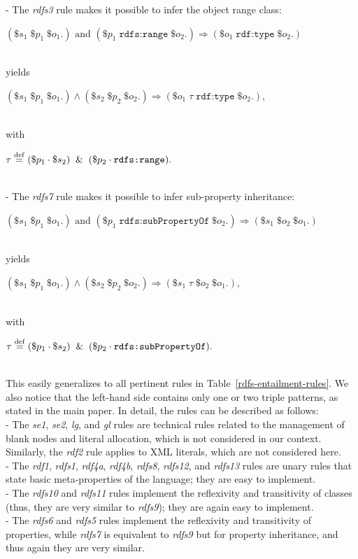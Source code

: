 \documentclass[sn-mathphys]{sn-jnl}
\newcommand{\defq}{\stackrel {\rm def}{=}}
\newcommand{\eqline}[1]{~\vspace{0.1cm}\\\centerline{$#1$}\vspace{0.1cm}\\}
\begin{document}
\begin{appendices}
- The \textit{rdfs3} rule makes it possible to infer the object range class:
\eqline{(\$s_1 \; \$p_1 \; \$o_1 .) \mbox{ and } (\$p_1 \; \texttt{rdfs:range} \; \$o_2 .) \Rightarrow (\$o_1 \; \texttt{rdf:type} \; \$o_2 .)}
yields
\eqline{(\$s_1 \; \$p_1 \; \$o_1 .) \wedge (\$s_2 \; \$p_2 \; \$o_2 .) \Rightarrow (\$o_1 \; \tau \; \texttt{rdf:type} \; \$o_2 .),}
with
\eqline{\tau \defq (\$p_1 \cdot \$s_2) \And (\$p_2 \cdot \texttt{rdfs:range}).}

- The \textit{rdfs7} rule makes it possible to infer sub-property inheritance:
\eqline{(\$s_1 \; \$p_1 \; \$o_1 .) \mbox{ and } (\$p_1 \; \texttt{rdfs:subPropertyOf} \; \$o_2 .) \Rightarrow (\$s_1 \; \$o_2 \; \$o_1 .)}
yields
\eqline{(\$s_1 \; \$p_1 \; \$o_1 .) \wedge (\$s_2 \; \$p_2 \; \$o_2 .) \Rightarrow (\$s_1 \; \tau \; \$o_2 \; \$o_1 .),}
with
\eqline{\tau \defq (\$p_1 \cdot \$s_2) \And (\$p_2 \cdot \texttt{rdfs:subPropertyOf}).}

This easily generalizes to all pertinent rules in Table~\ref{rdfs-entailment-rules}. We also notice that the left-hand side contains only one or two triple patterns, as stated in the main paper. In detail, the rules can be described as follows:
\\- The \textit{se1}, \textit{se2}, \textit{lg},  and \textit{gl} rules are technical rules related to the management of blank nodes and literal allocation, which is not considered in our context. Similarly, the \textit{rdf2} rule applies to XML literals, which are not considered here.
\\- The \textit{rdf1}, \textit{rdfs1}, \textit{rdf4a}, \textit{rdf4b}, \textit{rdfs8}, \textit{rdfs12}, and \textit{rdfs13} rules are unary rules that state basic meta-properties of the language; they are easy to implement.
\\ - The \textit{rdfs10} and \textit{rdfs11} rules implement the reflexivity and transitivity of classes (thus, they are very similar to \textit{rdfs9}); they are again easy to implement.
\\ - The \textit{rdfs6} and \textit{rdfs5} rules implement the reflexivity and transitivity of properties, while \textit{rdfs7} is equivalent to \textit{rdfs9} but for property inheritance, and thus again they are very similar.


\end{appendices}
\end{document}
